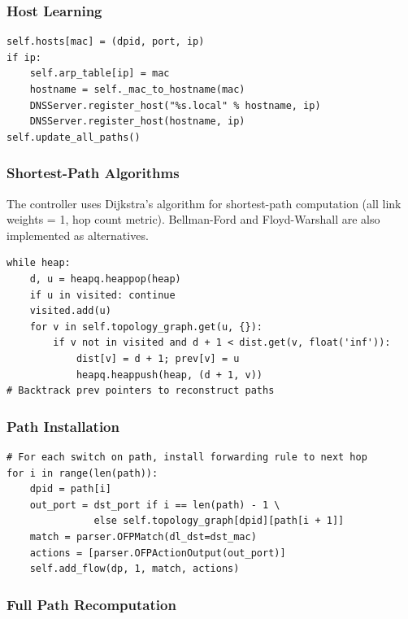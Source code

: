 \documentclass[12pt,a4paper]{article}
\begin{document}
\subsubsection{Host Learning}

\begin{lstlisting}[caption={Host Learning �� DNS Registration}]
self.hosts[mac] = (dpid, port, ip)
if ip:
    self.arp_table[ip] = mac
    hostname = self._mac_to_hostname(mac)
    DNSServer.register_host("%s.local" % hostname, ip)
    DNSServer.register_host(hostname, ip)
self.update_all_paths()
\end{lstlisting}

\subsubsection{Shortest-Path Algorithms}

The controller uses Dijkstra's algorithm for shortest-path computation (all link weights = 1, hop count metric). Bellman-Ford and Floyd-Warshall are also implemented as alternatives.

\begin{lstlisting}[caption={Dijkstra's Algorithm (heapq-based)}]
while heap:
    d, u = heapq.heappop(heap)
    if u in visited: continue
    visited.add(u)
    for v in self.topology_graph.get(u, {}):
        if v not in visited and d + 1 < dist.get(v, float('inf')):
            dist[v] = d + 1; prev[v] = u
            heapq.heappush(heap, (d + 1, v))
# Backtrack prev pointers to reconstruct paths
\end{lstlisting}

\subsubsection{Path Installation}

\begin{lstlisting}[caption={Install Flow Entries Along a Path}]
# For each switch on path, install forwarding rule to next hop
for i in range(len(path)):
    dpid = path[i]
    out_port = dst_port if i == len(path) - 1 \
               else self.topology_graph[dpid][path[i + 1]]
    match = parser.OFPMatch(dl_dst=dst_mac)
    actions = [parser.OFPActionOutput(out_port)]
    self.add_flow(dp, 1, match, actions)
\end{lstlisting}

\subsubsection{Full Path Recomputation}
\end{document}
